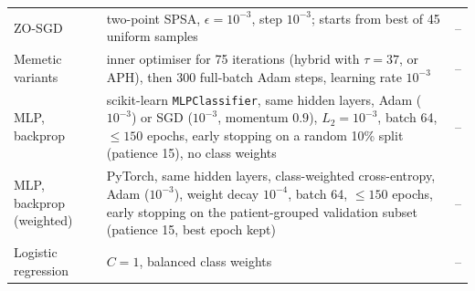 \documentclass[preprint,12pt]{elsarticle}
\begin{document}
\begin{table}[!ht]
\begin{tabular}{p{2.6cm}p{8.6cm}c}
ZO-SGD & two-point SPSA, $\epsilon=10^{-3}$, step $10^{-3}$; starts from best of 45 uniform samples & -- \\
Memetic variants & inner optimiser for 75 iterations (hybrid with $\tau=37$, or APH), then 300 full-batch Adam steps, learning rate $10^{-3}$ & -- \\
MLP, backprop & scikit-learn \texttt{MLPClassifier}, same hidden layers, Adam ($10^{-3}$) or SGD ($10^{-3}$, momentum $0.9$), $L_2=10^{-3}$, batch 64, $\le150$ epochs, early stopping on a random 10\% split (patience 15), no class weights & -- \\
MLP, backprop (weighted) & PyTorch, same hidden layers, class-weighted cross-entropy, Adam ($10^{-3}$), weight decay $10^{-4}$, batch 64, $\le150$ epochs, early stopping on the patient-grouped validation subset (patience 15, best epoch kept) & -- \\
Logistic regression & $C=1$, balanced class weights & -- \\
\bottomrule
\end{tabular}
\end{table}

\nolinenumbers


\end{document}
